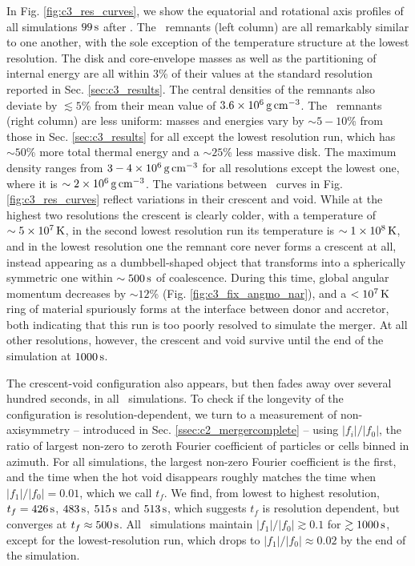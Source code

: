 In Fig. \ref{fig:c3_res_curves}, we show the equatorial and rotational axis profiles of all simulations $99\,\mathrm{s}$ after \tcoal.  The \gasoline\ remnants (left column) are all remarkably similar to one another, with the sole exception of the temperature structure at the lowest resolution.  The disk and core-envelope masses as well as the partitioning of internal energy are all within $3$\% of their values at the standard resolution reported in Sec. \ref{sec:c3_results}.  The central densities of the remnants also deviate by $\lesssim5$\% from their mean value of $3.6\times10^{6}\,\gcc$.  The \arepo\ remnants (right column) are less uniform: masses and energies vary by $\sim5-10$\% from those in Sec. \ref{sec:c3_results} for all except the lowest resolution run, which has $\sim50$\% more total thermal energy and a $\sim25$\% less massive disk.  The maximum density ranges from $3-4\times10^6\,\gcc$ for all resolutions except the lowest one, where it is $\sim2\times10^6\,\gcc$.  The variations between \arepo\ curves in Fig. \ref{fig:c3_res_curves} reflect variations in their crescent and void.  While at the highest two resolutions the crescent is clearly colder, with a temperature of $\sim5\times10^7\,\mathrm{K}$, in the second lowest resolution run its temperature is $\sim1\times10^8\,\mathrm{K}$, and in the lowest resolution one the remnant core never forms a crescent at all, instead appearing as a dumbbell-shaped object that transforms into a spherically symmetric one within $\sim500\,\mathrm{s}$ of coalescence.  During this time, global angular momentum decreases by $\sim12$\% (Fig. \ref{fig:c3_fix_angmo_nar}), and a $<10^7\,\mathrm{K}$ ring of material spuriously forms at the interface between donor and accretor, both indicating that this run is too poorly resolved to simulate the merger.  At all other resolutions, however, the crescent and void survive until the end of the simulation at $1000\,\mathrm{s}$.

The crescent-void configuration also appears, but then fades away over several hundred seconds, in all \gasoline\ simulations.  To check if the longevity of the configuration is resolution-dependent, we turn to a measurement of non-axisymmetry -- introduced in Sec. \ref{ssec:c2_mergercomplete} -- using $|f_i|/|f_0|$, the ratio of largest non-zero to zeroth Fourier coefficient of particles or cells binned in azimuth.  For all simulations, the largest non-zero Fourier coefficient is the first, and the time when the hot void disappears roughly matches the time when $|f_1|/|f_0| = 0.01$, which we call $t_f$.  We find, from lowest to highest resolution, $t_f = 426\,\mathrm{s}$, $483\,\mathrm{s}$, $515\,\mathrm{s}$ and $513\,\mathrm{s}$, which suggests $t_f$ is resolution dependent, but converges at $t_f \approx 500\,\mathrm{s}$.   All \arepo\ simulations maintain $|f_1|/|f_0| \gtrsim 0.1$ for $\gtrsim 1000\,\mathrm{s}$, except for the lowest-resolution run, which drops to $|f_1|/|f_0| \approx 0.02$ by the end of the simulation.

